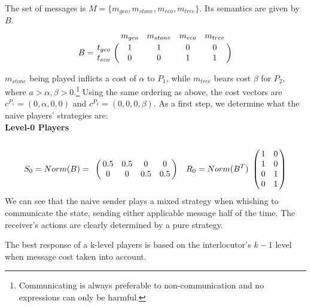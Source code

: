 \documentclass[10pt,a4paper]{article}
\begin{document}
The set of messages is $M=\{m_{geo}, m_{stone}, m_{eco}, m_{tree}\}$. Its semantics are given by $B$.
 \begin{equation*}
 B =
 \bordermatrix{
            & m_{geo} & m_{stone} & m_{eco} & m_{tree}    \cr
   t_{geo}  &       1 &         1 & 0       & 0 \cr
   t_{eco}  &       0 &         0 & 1       & 1
 }
 \end{equation*}

$m_{stone}$ being played inflicts a cost of $\alpha$ to $P_1$, while $m_{tree}$ bears cost $\beta$ for $P_2$, where $a>\alpha,\beta>0$.\footnote{Communicating is always preferable to non-communication and no expressions can only be harmful.} Using the same ordering as above, the cost vectors are $c^{P_1}=(0,\alpha,0,0)$ and $c^{P_2}=(0,0,0,\beta)$. As a first step, we determine what the naive players' strategies are:\\
\textbf{Level-0 Players}\\
\begin{equation*}
S_0=Norm(B)=
\bordermatrix{
            & & & &    \cr
 &       0.5 &         0.5 & 0       & 0 \cr
 &       0 &         0 & 0.5       & 0.5
 }\quad
R_0=Norm(B^T)
\bordermatrix{
            &  & \cr
    & 1 & 0 \cr
     & 1 & 0 \cr
     & 0 & 1 \cr
     & 0 & 1 \cr
 }
\end{equation*}
We can see that the naive sender plays a mixed strategy when whishing to communicate the state, sending either applicable message half of the time. The receiver's actions are clearly determined by a pure strategy.

The best response of a k-level players is based on the interlocutor's $k-1$ level when message cost taken into account.
\end{document}
